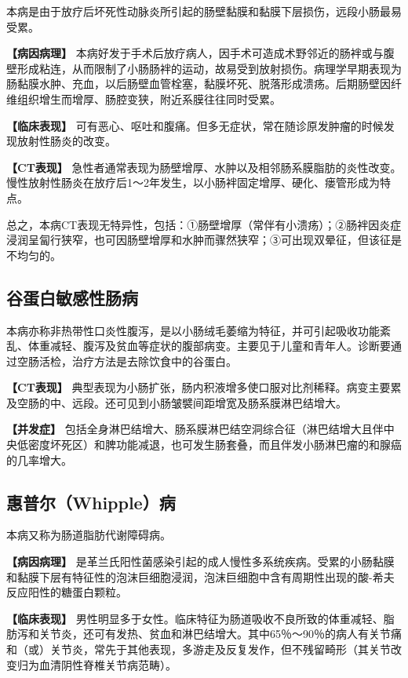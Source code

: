 本病是由于放疗后坏死性动脉炎所引起的肠壁黏膜和黏膜下层损伤，远段小肠最易受累。

\textbf{【病因病理】}
本病好发于手术后放疗病人，因手术可造成术野邻近的肠袢或与腹壁形成粘连，从而限制了小肠肠袢的运动，故易受到放射损伤。病理学早期表现为肠黏膜水肿、充血，以后肠壁血管栓塞，黏膜坏死、脱落形成溃疡。后期肠壁因纤维组织增生而增厚、肠腔变狭，附近系膜往往同时受累。

\textbf{【临床表现】}
可有恶心、呕吐和腹痛。但多无症状，常在随诊原发肿瘤的时候发现放射性肠炎的改变。

\textbf{【CT表现】}
急性者通常表现为肠壁增厚、水肿以及相邻肠系膜脂肪的炎性改变。慢性放射性肠炎在放疗后1～2年发生，以小肠袢固定增厚、硬化、瘘管形成为特点。

总之，本病CT表现无特异性，包括：①肠壁增厚（常伴有小溃疡）；②肠袢因炎症浸润呈匐行狭窄，也可因肠壁增厚和水肿而骤然狭窄；③可出现双晕征，但该征是不均匀的。

\subsection{谷蛋白敏感性肠病}

本病亦称非热带性口炎性腹泻，是以小肠绒毛萎缩为特征，并可引起吸收功能紊乱、体重减轻、腹泻及贫血等症状的腹部病变。主要见于儿童和青年人。诊断要通过空肠活检，治疗方法是去除饮食中的谷蛋白。

\textbf{【CT表现】}
典型表现为小肠扩张，肠内积液增多使口服对比剂稀释。病变主要累及空肠的中、远段。还可见到小肠皱襞间距增宽及肠系膜淋巴结增大。

\textbf{【并发症】}
包括全身淋巴结增大、肠系膜淋巴结空洞综合征（淋巴结增大且伴中央低密度坏死区）和脾功能减退，也可发生肠套叠，而且伴发小肠淋巴瘤的和腺癌的几率增大。

\subsection{惠普尔（Whipple）病}

本病又称为肠道脂肪代谢障碍病。

\textbf{【病因病理】}
是革兰氏阳性菌感染引起的成人慢性多系统疾病。受累的小肠黏膜和黏膜下层有特征性的泡沫巨细胞浸润，泡沫巨细胞中含有周期性出现的酸-希夫反应阳性的糖蛋白颗粒。

\textbf{【临床表现】}
男性明显多于女性。临床特征为肠道吸收不良所致的体重减轻、脂肪泻和关节炎，还可有发热、贫血和淋巴结增大。其中65％～90％的病人有关节痛和（或）关节炎，常先于其他表现，多游走及反复发作，但不残留畸形（其关节改变归为血清阴性脊椎关节病范畴）。

